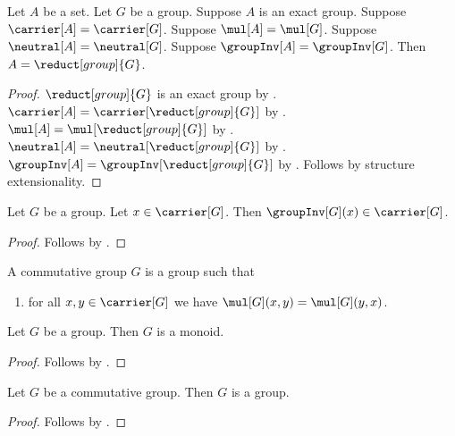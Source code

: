 \begin{theorem}\label{exact_group_eq_group_reduct}
    Let $A$ be a set.
    Let $G$ be a group.
    Suppose $A$ is an exact group.
    Suppose $\carrier[A]=\carrier[G]$.
    Suppose $\mul[A]=\mul[G]$.
    Suppose $\neutral[A]=\neutral[G]$.
    Suppose $\groupInv[A]=\groupInv[G]$.
    Then $A=\reduct[group]{G}$.
\end{theorem}
\begin{proof}
    $\reduct[group]{G}$ is an exact group by
        .
    $\carrier[A]=\carrier[\reduct[group]{G}]$ by
        .
    $\mul[A]=\mul[\reduct[group]{G}]$ by
        .
    $\neutral[A]=\neutral[\reduct[group]{G}]$ by
        .
    $\groupInv[A]=\groupInv[\reduct[group]{G}]$ by
        .
    Follows by structure extensionality.
\end{proof}

\begin{proposition}\label{group_inverse_type}
    Let $G$ be a group.
    Let $x\in\carrier[G]$.
    Then $\groupInv[G](x)\in\carrier[G]$.
\end{proposition}
\begin{proof}
    Follows by .
\end{proof}

\begin{struct}\label{commutative_group}
    A commutative group $G$ is a group such that
    \begin{enumerate}
        \item\label{commutative_group_commutative}
            for all $x,y\in\carrier[G]$ we have
                $\mul[G](x,y)=\mul[G](y,x)$.
    \end{enumerate}
\end{struct}

\begin{corollary}\label{group_is_monoid}
    Let $G$ be a group.
    Then $G$ is a monoid.
\end{corollary}
\begin{proof}
    Follows by .
\end{proof}

\begin{corollary}\label{commutative_group_is_group}
    Let $G$ be a commutative group.
    Then $G$ is a group.
\end{corollary}
\begin{proof}
    Follows by .
\end{proof}


